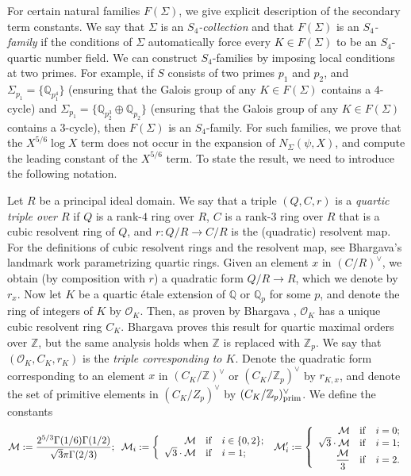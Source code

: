 \documentclass{article}
\def\Z{{\mathbb Z}}
\def\O{{\mathcal O}}
\def\prim{{\rm prim}}
\def\Q{{\mathbb Q}}
\def\Z{{\mathbb Z}}
\def\Q{{\mathbb Q}}
\begin{document}
For certain natural families $F(\Sigma)$, we give explicit description of the secondary term constants.
We say that $\Sigma$ is an {\it $S_4$-collection} and that $F(\Sigma)$ is an {\it $S_4$-family} if the conditions of $\Sigma$ automatically force every $K\in F(\Sigma)$ to be an $S_4$-quartic number field. We can construct $S_4$-families by imposing local conditions at two primes. For example, if $S$ consists of two primes $p_1$ and $p_2$, and $\Sigma_{p_1}=\{\Q_{p_1^4}\}$ (ensuring that the Galois group of any $K\in F(\Sigma)$ contains a $4$-cycle) and $\Sigma_{p_1}=\{\Q_{p_2^3}\oplus\Q_{p_2}\}$ (ensuring that the Galois group of any $K\in F(\Sigma)$ contains a $3$-cycle), then $F(\Sigma)$ is an $S_4$-family. For such families, we prove that the $X^{5/6}\log X$ term does not occur in the expansion of $N_\Sigma(\psi,X)$, and compute the leading constant of the $X^{5/6}$ term. To state the result, we need to introduce the following notation.


Let $R$ be a principal ideal domain. We say that a triple $(Q,C,r)$ is a {\it quartic triple over $R$} if $Q$ is a rank-$4$ ring over $R$, $C$ is a rank-$3$ ring over $R$ that is a cubic resolvent ring of $Q$, and $r:Q/R\to C/R$ is the (quadratic) resolvent map. For the definitions of cubic resolvent rings and the resolvent map, see Bhargava's landmark work \cite{BHCL3} parametrizing quartic rings. Given an element $x$ in $(C/R)^\vee$, we obtain (by composition with $r$) a quadratic form $Q/R\to R$, which we denote by $r_x$. Now let $K$ be a quartic \'etale extension of $\Q$ or $\Q_p$ for some $p$, and denote the ring of integers of $K$ by $\O_K$. Then, as proven by Bhargava \cite{BHCL3}, $\O_K$ has a unique cubic resolvent ring $C_K$. Bhargava proves this result for quartic maximal orders over $\Z$, but the same analysis holds when $\Z$ is replaced with $\Z_p$. We say that $(\O_K,C_K,r_K)$ is the {\it triple corresponding to $K$}. Denote the quadratic form corresponding to an element $x$ in $(C_K/\Z)^\vee$ or $(C_K/\Z_p)^\vee$ by $r_{K,x}$, and denote the set of primitive elements in $(C_K/Z_p)^\vee$ by $(C_K/\Z_p)^\vee_\prim$. We define the constants
\begin{equation}\label{eq:M_def}
\mathcal M:= \frac{2^{5/3}\Gamma(1/6)\Gamma(1/2)}{\sqrt{3}\pi\Gamma(2/3)};\;\;
\mathcal M_i:=\left\{
\begin{array}{rcl}
\mathcal M&{\rm if}&i\in\{0,2\};
\\
\sqrt{3}\cdot\mathcal M&{\rm if}&
i=1;
\end{array}
\right.
\;\mathcal M_i':=\left\{
\begin{array}{rcl}
\mathcal M&{\rm if }& i=0;\\
\sqrt{3}\cdot \mathcal M&{\rm if }& i=1;\\
\displaystyle\frac{\mathcal M}{3}&{\rm if }& i=2.
\end{array}
\right.
\end{equation}
\end{document}
